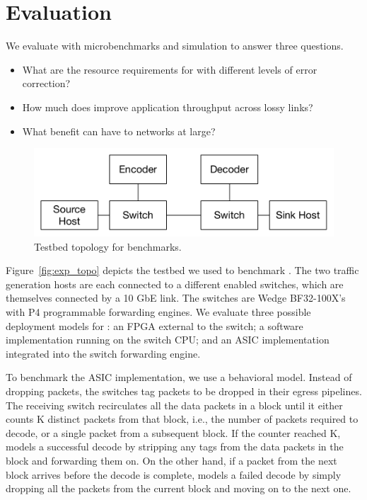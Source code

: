 \section{Evaluation}
\label{sec:evaluation}

We evaluate \OurSys with microbenchmarks and simulation to answer three questions.
\begin{itemize}

\item What are the resource requirements for \OurSys with different levels of 
error correction?

\item How much does \OurSys improve application throughput across lossy links?

\item What benefit can \OurSys have to networks at large?
\end{itemize}

\begin{figure}
  \centering
  \includegraphics[width=0.3\paperwidth]{exp_topo.pdf}
  \caption{\label{fig:format} Testbed topology for benchmarks.}
\end{figure}

Figure~\ref{fig:exp_topo} depicts the testbed we used to benchmark \OurSys.
The two traffic generation hosts are each connected to a different \OurSys
enabled switches, which are themselves connected by a 10 GbE link. The
switches are Wedge BF32-100X's with P4 programmable forwarding engines. We
evaluate three possible deployment models for \OurSys: an FPGA external to
the switch; a software implementation running on the switch CPU; and an ASIC  
implementation integrated into the switch forwarding engine. 

To benchmark the ASIC implementation, we use a behavioral model. Instead  of
dropping packets, the switches tag packets to be dropped in their  egress
pipelines. The receiving switch recirculates all the data packets in a block 
until it either counts K distinct packets from that block, i.e., the number of packets 
required to decode, or a single packet from a subsequent block. If the counter 
reached K, \OurSys models a successful decode by stripping any tags from the 
data packets in the block and forwarding them on. On the other hand, if 
a packet from the next block arrives before the decode is complete, \OurSys 
models a failed decode by simply dropping all the packets from the current 
block and moving on to the next one. 

